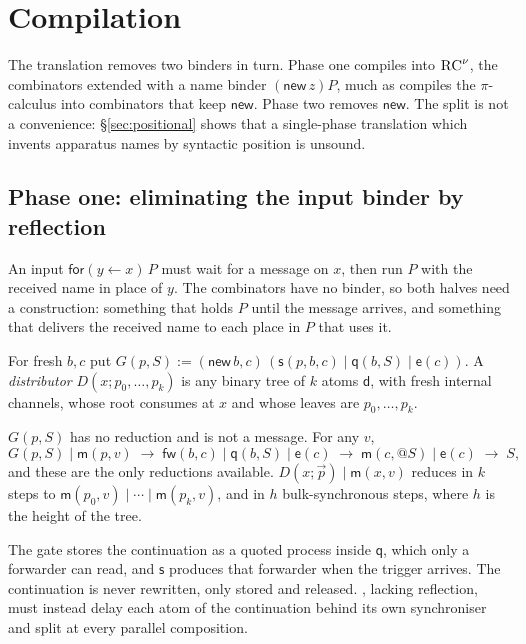 \documentclass[acmsmall,screen,review,anonymous]{acmart}
\makeatletter
\newcommand{\quo}[1]{@#1}
\newcommand{\inp}[3]{\mathsf{for}(#1 \leftarrow #2)\,#3}
\newcommand{\red}{\longrightarrow}
\newcommand{\mm}{\mathsf{m}}
\newcommand{\dd}{\mathsf{d}}
\newcommand{\fw}{\mathsf{fw}}
\newcommand{\sy}{\mathsf{s}}
\newcommand{\ev}{\mathsf{e}}
\newcommand{\qq}{\mathsf{q}}
\newcommand{\rcnu}{\textsc{RC}^{\nu}}
\makeatother
\begin{document}
\section{Compilation}
\label{sec:compile}

The translation removes two binders in turn. Phase one compiles into
$\rcnu$, the combinators extended with a name binder
$(\mathsf{new}\,z)P$, much as \citet{Yoshida02} compiles the $\pi$-calculus
into combinators that keep $\mathsf{new}$. Phase two removes $\mathsf{new}$.
The split is not a convenience: \S\ref{sec:positional} shows that a
single-phase translation which invents apparatus names by syntactic position
is unsound.

\subsection{Phase one: eliminating the input binder by reflection}
\label{sec:phase1}

An input $\inp{y}{x}{P}$ must wait for a message on $x$, then run $P$ with the
received name in place of $y$. The combinators have no binder, so both halves
need a construction: something that holds $P$ until the message arrives, and
something that delivers the received name to each place in $P$ that uses it.

\begin{definition}
For fresh $b,c$ put $G(p,S) := (\mathsf{new}\,b,c)\,(\sy(p,b,c) \mid \qq(b,S)
\mid \ev(c))$. A \emph{distributor} $D(x;p_{0},\dots,p_{k})$ is any binary tree
of $k$ atoms $\dd$, with fresh internal channels, whose root consumes at $x$
and whose leaves are $p_{0},\dots,p_{k}$.
\end{definition}

\begin{lemma}[Gate]
\label{lem:gate}
$G(p,S)$ has no reduction and is not a message. For any $v$,
\[
  G(p,S) \mid \mm(p,v)
  \;\red\; \fw(b,c) \mid \qq(b,S) \mid \ev(c)
  \;\red\; \mm(c,\quo{S}) \mid \ev(c)
  \;\red\; S ,
\]
and these are the only reductions available. $D(x;\vec p) \mid \mm(x,v)$
reduces in $k$ steps to $\mm(p_{0},v) \mid \cdots \mid \mm(p_{k},v)$, and in
$h$ bulk-synchronous steps, where $h$ is the height of the tree.
\end{lemma}

The gate stores the continuation as a quoted process inside $\qq$, which only
a forwarder can read, and $\sy$ produces that forwarder when the trigger
arrives. The continuation is never rewritten, only stored and released.
\citet[rules (I), (V), (VI)]{Yoshida02}, lacking reflection, must instead
delay each atom of the continuation behind its own synchroniser and split at
every parallel composition.
\end{document}
